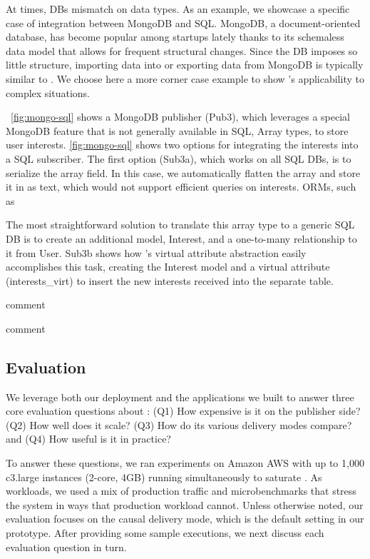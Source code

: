 At times, DBs mismatch on data types.  As an example, we showcase a specific
case of integration between MongoDB and SQL.
MongoDB, a document-oriented database, has become popular among startups
lately thanks to its schemaless data model that allows for frequent
structural changes.  Since the DB imposes so little structure, importing data
into or exporting data from MongoDB is typically similar to
\label{fig:mongo-to-star}. We choose here a more corner case example to
show \synapse's applicability to complex situations.

\F~\ref{fig:mongo-sql} shows a MongoDB publisher (Pub3), which leverages a
special MongoDB feature that is not generally available in SQL,
Array types, to store user interests.  \F\ref{fig:mongo-sql} shows two options
for integrating the interests into a SQL subscriber.  The first option (Sub3a),
which works on all SQL DBs, is to serialize the array field.
In this case, we automatically flatten the array and store it in as text, which would not support efficient queries on interests.  ORMs, such as

The most straightforward solution to translate this array type to a generic SQL DB is to create an additional model, {\code \footnotesize Interest}, and a one-to-many relationship to it from {\code \footnotesize User}.
Sub3b shows how \synapse's virtual attribute abstraction easily accomplishes
this task, creating the {\code \footnotesize Interest} model and a virtual
attribute  ({\code \footnotesize interests\_virt}) to insert the new interests
received into the separate table.

   comment

   comment

\subsection{Evaluation}
\label{sec:evaluation}

We leverage both our deployment and the applications we built to answer three
core evaluation questions about \synapse: (Q1) How expensive is it
on the publisher side? (Q2) How well does it scale? (Q3) How do its various
delivery modes compare? and (Q4) How useful is it in practice?

To answer these questions, we ran experiments on Amazon AWS with up to 1,000
c3.large instances (2-core, 4GB) running simultaneously to saturate \synapse.
As workloads, we used a mix of \crowdtap production traffic and microbenchmarks
that stress the system in ways that production workload cannot.  Unless
otherwise noted, our evaluation focuses on the causal delivery mode, which is
the default setting in our prototype.  After providing some sample executions,
we next discuss each evaluation question in turn.

